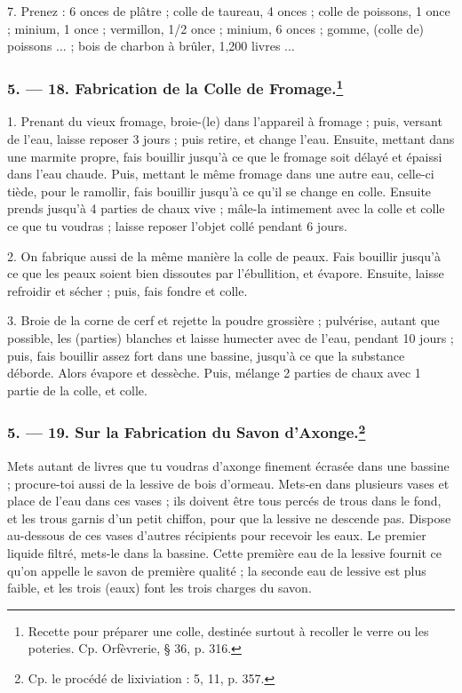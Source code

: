 \documentclass[a4paper, 11pt, oneside, polutonikogreek, french]{article}
\begin{document}
7. Prenez : 6 onces de plâtre ; colle de taureau, 4 onces ; colle de poissons, 1 once ; minium, 1 once ; vermillon, 1/2 once ; minium, 6 onces ; gomme, (colle de) poissons ... ; bois de charbon à brûler, 1,200 livres ...

\bigskip
\centerline{\EightStarTaper}
\centerline{\EightStarTaper\EightStarTaper}
\bigskip

\subsubsection[5. --- 18. Fabrication de la Colle de Fromage.]{5. --- 18. Fabrication de la Colle de Fromage.\footnote{Recette pour préparer une colle, destinée surtout à recoller le verre ou les poteries. Cp. Orfèvrerie, § 36, p. 316.}}

1. Prenant du vieux fromage, broie-(le) dans l'appareil à fromage ; puis, versant de l'eau, laisse reposer 3 jours ; puis retire, et change l'eau. Ensuite, mettant dans une marmite propre, fais bouillir jusqu'à ce que le fromage soit délayé et épaissi dans l'eau chaude. Puis, mettant le même fromage dans une autre eau, celle-ci tiède, pour le ramollir, fais bouillir jusqu'à ce qu'il se change en colle. Ensuite prends jusqu'à 4 parties de chaux vive ; mâle-la intimement avec la colle et colle ce que tu voudras ; laisse reposer l'objet collé pendant 6 jours.

2. On fabrique aussi de la même manière la colle de peaux. Fais bouillir jusqu'à ce que les peaux soient bien dissoutes par l'ébullition, et évapore. Ensuite, laisse refroidir et sécher ; puis, fais fondre et colle.

3. Broie de la corne de cerf et rejette la poudre grossière ; pulvérise, autant que possible, les (parties) blanches et laisse humecter avec de l'eau, pendant 10 jours ; puis, fais bouillir assez fort dans une bassine, jusqu'à ce que la substance déborde. Alors évapore et dessèche. Puis, mélange 2 parties de chaux avec 1 partie de la colle, et colle.

\bigskip
\centerline{\EightStarTaper}
\centerline{\EightStarTaper\EightStarTaper}
\bigskip

\subsubsection[5. --- 19. Sur la Fabrication du Savon d'Axonge.]{5. --- 19. Sur la Fabrication du Savon d'Axonge.\footnote{Cp. le procédé de lixiviation : 5, 11, p. 357.}}

Mets autant de livres que tu voudras d'axonge finement écrasée dans une bassine ; procure-toi aussi de la lessive de bois d'ormeau. Mets-en dans plusieurs vases et place de l'eau dans ces vases ; ils doivent être tous percés de trous dans le fond, et les trous garnis d'un petit chiffon, pour que la lessive ne descende pas. Dispose au-dessous de ces vases d'autres récipients pour recevoir les eaux. Le premier liquide filtré, mets-le dans la bassine. Cette première eau de la lessive fournit ce qu'on appelle le savon de première qualité ; la seconde eau de lessive est plus faible, et les trois (eaux) font les trois charges du savon.
\end{document}
